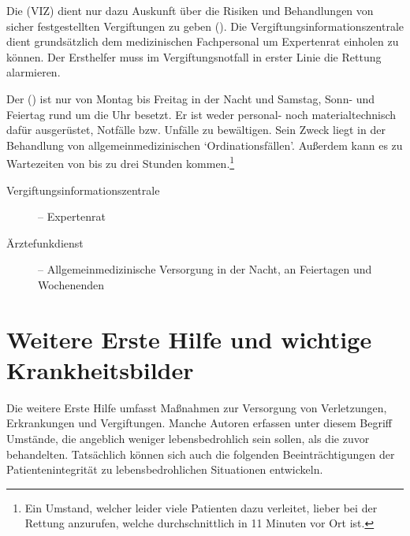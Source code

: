 {
Die
 (VIZ) dient nur dazu
Auskunft über die Risiken und Behandlungen von sicher
festgestellten Vergiftungen zu geben (). Die
Vergiftungsinformationszentrale dient grundsätzlich dem
medizinischen Fachpersonal um Expertenrat einholen zu
können. Der Ersthelfer muss im Vergiftungsnotfall in erster
Linie die Rettung alarmieren.

Der  ()
ist nur von Montag bis Freitag in der Nacht und Samstag, Sonn- und
Feiertag rund um die Uhr besetzt. Er
ist weder personal- noch materialtechnisch dafür
ausgerüstet, Notfälle bzw. Unfälle zu bewältigen. 
Sein Zweck liegt in der
Behandlung von allgemeinmedizinischen
\enquote*{Ordinationsfällen}. Außerdem kann es zu Wartezeiten von
bis zu drei Stunden kommen.\footnote{Ein Umstand,
welcher leider viele Patienten dazu verleitet, lieber bei
der Rettung anzurufen, welche durchschnittlich in 11 Minuten
vor Ort ist.}
}{
\begin{description}
  \item[Vergiftungsinformationszentrale]  --
  Expertenrat
  \item[Ärztefunkdienst]  -- Allgemeinmedizinische Versorgung in
  der Nacht, an Feiertagen und Wochenenden
\end{description}
}{}{}{}



\section{Weitere Erste Hilfe und wichtige Krankheitsbilder}

Die weitere Erste Hilfe umfasst Maßnahmen zur Versorgung von
Verletzungen, Erkrankungen und Vergiftungen. Manche Autoren erfassen
unter diesem Begriff Umstände, die
angeblich weniger lebensbedrohlich sein sollen, als die zuvor behandelten. Tatsächlich
können sich auch die folgenden Beeinträchtigungen der
Patientenintegrität zu lebensbedrohlichen Situationen entwickeln. 

